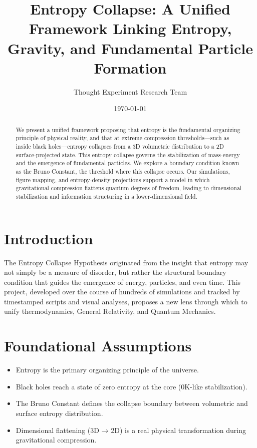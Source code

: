 \documentclass[12pt]{article}
\title{Entropy Collapse: A Unified Framework Linking Entropy, Gravity, and Fundamental Particle Formation}
\author{Thought Experiment Research Team}
\date{\today}
\begin{document}
\maketitle

\begin{abstract}
We present a unified framework proposing that entropy is the fundamental organizing principle of physical reality, and that at extreme compression thresholds—such as inside black holes—entropy collapses from a 3D volumetric distribution to a 2D surface-projected state. This entropy collapse governs the stabilization of mass-energy and the emergence of fundamental particles. We explore a boundary condition known as the Bruno Constant, the threshold where this collapse occurs. Our simulations, figure mapping, and entropy-density projections support a model in which gravitational compression flattens quantum degrees of freedom, leading to dimensional stabilization and information structuring in a lower-dimensional field.
\end{abstract}

\tableofcontents

\section{Introduction}
The Entropy Collapse Hypothesis originated from the insight that entropy may not simply be a measure of disorder, but rather the structural boundary condition that guides the emergence of energy, particles, and even time. This project, developed over the course of hundreds of simulations and tracked by timestamped scripts and visual analyses, proposes a new lens through which to unify thermodynamics, General Relativity, and Quantum Mechanics.

\section{Foundational Assumptions}
\begin{itemize}
    \item Entropy is the primary organizing principle of the universe.
    \item Black holes reach a state of zero entropy at the core (0K-like stabilization).
    \item The Bruno Constant defines the collapse boundary between volumetric and surface entropy distribution.
    \item Dimensional flattening (3D → 2D) is a real physical transformation during gravitational compression.
\end{itemize}
\end{document}
